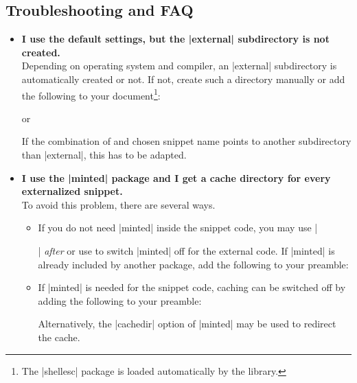
% 
% 
% 






\subsection{Troubleshooting and FAQ}\label{subsec:external_troubleshooting}

\begin{itemize}

\item\textbf{I use the default settings, but the |external| subdirectory is
  not created.}\\
  Depending on operating system and compiler, an |external| subdirectory is
  automatically created or not. If not, create such a directory manually
  or add the following to your document\footnote{The |shellesc| package
  is loaded automatically by the library.}:
\begin{dispListing}
\end{dispListing}
or
\begin{dispListing}
\end{dispListing}
  If the combination of  and chosen snippet
  name points to another subdirectory than |external|, this has to be
  adapted.

\item\textbf{I use the |minted| package and I get a cache directory for
  every externalized snippet.}\\
  To avoid this problem, there are several ways.
  \begin{itemize}
  \item If you do not need |minted| inside the snippet code, you may use
    |\usepackage{minted}| \emph{after} 
    or use  to switch |minted| off for the external code.
    If |minted| is already included by another package, add the following to
    your preamble:
\begin{dispListing}
\end{dispListing}
  \item If |minted| is needed for the snippet code, caching can be switched
    off by adding the following to your preamble:
\begin{dispListing}
\end{dispListing}
  Alternatively, the |cachedir| option of |minted| may be used to redirect
  the cache.
  \end{itemize}


\end{itemize}

